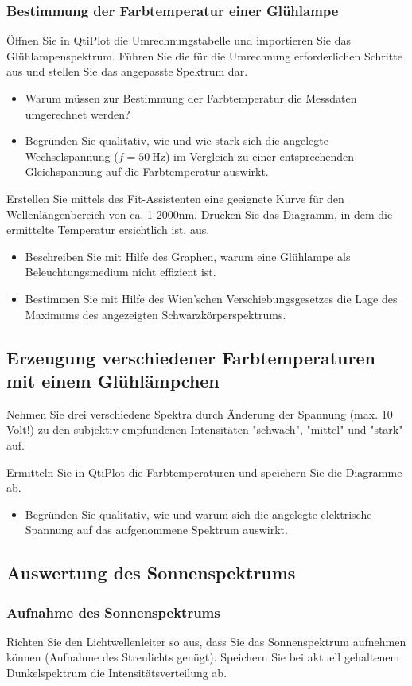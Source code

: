 \subsubsection{Bestimmung der Farbtemperatur einer Glühlampe}
Öffnen Sie in QtiPlot die Umrechnungstabelle und importieren Sie das Glühlampenspektrum. Führen Sie die für die Umrechnung erforderlichen Schritte aus und stellen Sie das angepasste Spektrum dar.
\begin{itemize}[label=$\blacktriangleright$]
	\item Warum müssen zur Bestimmung der Farbtemperatur die Messdaten umgerechnet werden?
	\item Begründen Sie qualitativ, wie und wie stark sich die angelegte Wechselspannung ($f=\SI{50}{\hertz}$) im Vergleich zu einer entsprechenden Gleichspannung auf die Farbtemperatur auswirkt.
\end{itemize}
Erstellen Sie mittels des Fit-Assistenten eine geeignete Kurve für den Wellenlängenbereich von ca. 1-2000nm. Drucken Sie das Diagramm, in dem die ermittelte Temperatur ersichtlich ist, aus.
\begin{itemize}[label=$\blacktriangleright$]
	\item Beschreiben Sie mit Hilfe des Graphen, warum eine Glühlampe als Beleuchtungsmedium nicht effizient ist.
	\item Bestimmen Sie mit Hilfe des Wien'schen Verschiebungsgesetzes die Lage des Maximums des angezeigten Schwarzkörperspektrums.
\end{itemize}
\subsection{Erzeugung verschiedener Farbtemperaturen mit einem Glühlämpchen}
Nehmen Sie drei verschiedene Spektra durch Änderung der Spannung (max. 10 Volt!) zu den subjektiv empfundenen Intensitäten "schwach", "mittel" und "stark" auf.

Ermitteln Sie in QtiPlot die Farbtemperaturen und speichern Sie die Diagramme ab.
\begin{itemize}[label=$\blacktriangleright$]
	\item Begründen Sie qualitativ, wie und warum sich die angelegte elektrische Spannung auf das aufgenommene Spektrum auswirkt.
\end{itemize}
\subsection{Auswertung des Sonnenspektrums}
\subsubsection{Aufnahme des Sonnenspektrums}
Richten Sie den Lichtwellenleiter so aus, dass Sie das Sonnenspektrum aufnehmen können (Aufnahme des Streulichts genügt). Speichern Sie bei aktuell gehaltenem Dunkelspektrum die Intensitätsverteilung ab.
